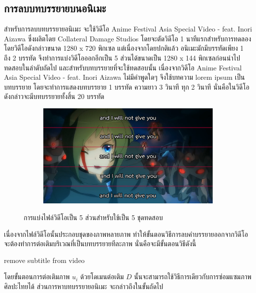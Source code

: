 \documentclass[hidelinks, a4paper,12pt]{article}
\numberwithin{equation}{section}							%
\numberwithin{equation}{section}
\begin{document}
{	
	
	\subsection{การลบบทบรรยายบนอนิเมะ}
	\hspace{1cm} สำหรับการลบบทบรรยายอนิเมะ จะใช้วิดีโอ Anime Festival Asia Special Video - feat. Inori Aizawa ซึ่งผลิตโดย Collateral Damage Studios โดยจะตัดวิดีโอ 1 นาทีแรกสำหรับการทดลอง โดยวิดีโอดังกล่าวขนาด 1280 x 720 พิกเซล แต่เนื่องจากโดยปกติแล้ว อนิเมะมักมีบรรทัดเพียง 1 ถึง 2 บรรทัด จึงทำการแบ่งวิดีโอออกอีกเป็น 5 ส่วนได้ขนาดเป็น 1280 x 144 พิกเซลก่อนนำไปทดสอบในลำดับถัดไป
	\hspace{1cm} และสำหรับบทบรรยายที่จะใช้ทดสอบนั้น เนื่องจากวิดีโอ Anime Festival Asia Special Video - feat. Inori Aizawa ไม่มีคำพูดใดๆ จึงใช้บทความ lorem ipsum เป็นบทบรรยาย โดยจะทำการแสดงบทบรรยาย 1 บรรทัด ความยาว 3 วินาที ทุก 2 วินาที นั่นคือในวิดีโอดังกล่าวจะมีบทบรรยายทั้งสิ้น 20 บรรทัด	
	
	\begin{figure}[H]
		\centering
		\begin{subfigure}{0.8\linewidth}
			\centering
			\includegraphics[width=0.8\linewidth]{images/inori-subbed-preview.png}
		\end{subfigure}
		\caption{การแบ่งไฟล์วิดีโอเป็น 5 ส่วนสำหรับใช้เป็น 5 ชุดทดสอบ}
	\end{figure}
	
	\hspace{1cm}เนื่องจากไฟล์วิดีโอนั้นประกอบชุดของภาพหลายภาพ ทำให้ขั้นตอนวิธีการลบคำบรรยายออกจากวิดีโอ จะต้องทำการต่อเติมบริเวณที่เป็นบทบรรยายทีละภาพ นั่นคือจะมีขั้นตอนวิธีดังนี้ \\
	
	\begin{algorithm}[H]
		\caption{remove subtitle from video}
	\end{algorithm}
	\vspace{1cm}
	\hspace{1cm} โดยขั้นตอนการต่อเติมภาพ $u_i$ ด้วยโดเมนต่อเติม $D$ นั้นจะสามารถใช้วิธีการเดียวกับการซ่อมแซมภาพศิลปะไทยได้ ส่วนการหาบทบรรยายอนิเมะ จะกล่าวถึงในขั้นถัดไป
	
}
\end{document}
